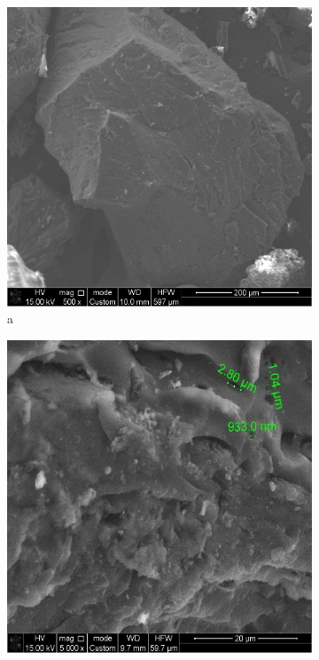 \begin{figure}[H]
    \centering
    \begin{subfigure}[b]{0.32\textwidth}
        \centering
        \includegraphics[width=\textwidth,height=\textwidth]{media/chem2/image15}
        \caption*{a}
    \end{subfigure}
    \hfill
    \begin{subfigure}[b]{0.32\textwidth}
        \centering
        \includegraphics[width=\textwidth,height=\textwidth]{media/chem2/image16}

\end{subfigure}
\end{figure}
